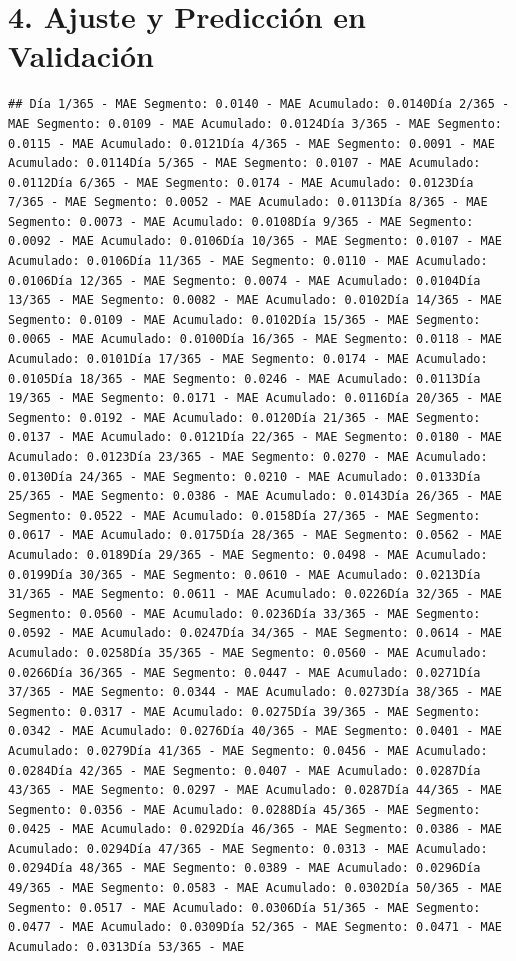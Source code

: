 \documentclass[
]{book}
\begin{document}
\section{4. Ajuste y Predicción en Validación}\label{ajuste-y-predicciuxf3n-en-validaciuxf3n}

\begin{verbatim}
## Día 1/365 - MAE Segmento: 0.0140 - MAE Acumulado: 0.0140Día 2/365 - MAE Segmento: 0.0109 - MAE Acumulado: 0.0124Día 3/365 - MAE Segmento: 0.0115 - MAE Acumulado: 0.0121Día 4/365 - MAE Segmento: 0.0091 - MAE Acumulado: 0.0114Día 5/365 - MAE Segmento: 0.0107 - MAE Acumulado: 0.0112Día 6/365 - MAE Segmento: 0.0174 - MAE Acumulado: 0.0123Día 7/365 - MAE Segmento: 0.0052 - MAE Acumulado: 0.0113Día 8/365 - MAE Segmento: 0.0073 - MAE Acumulado: 0.0108Día 9/365 - MAE Segmento: 0.0092 - MAE Acumulado: 0.0106Día 10/365 - MAE Segmento: 0.0107 - MAE Acumulado: 0.0106Día 11/365 - MAE Segmento: 0.0110 - MAE Acumulado: 0.0106Día 12/365 - MAE Segmento: 0.0074 - MAE Acumulado: 0.0104Día 13/365 - MAE Segmento: 0.0082 - MAE Acumulado: 0.0102Día 14/365 - MAE Segmento: 0.0109 - MAE Acumulado: 0.0102Día 15/365 - MAE Segmento: 0.0065 - MAE Acumulado: 0.0100Día 16/365 - MAE Segmento: 0.0118 - MAE Acumulado: 0.0101Día 17/365 - MAE Segmento: 0.0174 - MAE Acumulado: 0.0105Día 18/365 - MAE Segmento: 0.0246 - MAE Acumulado: 0.0113Día 19/365 - MAE Segmento: 0.0171 - MAE Acumulado: 0.0116Día 20/365 - MAE Segmento: 0.0192 - MAE Acumulado: 0.0120Día 21/365 - MAE Segmento: 0.0137 - MAE Acumulado: 0.0121Día 22/365 - MAE Segmento: 0.0180 - MAE Acumulado: 0.0123Día 23/365 - MAE Segmento: 0.0270 - MAE Acumulado: 0.0130Día 24/365 - MAE Segmento: 0.0210 - MAE Acumulado: 0.0133Día 25/365 - MAE Segmento: 0.0386 - MAE Acumulado: 0.0143Día 26/365 - MAE Segmento: 0.0522 - MAE Acumulado: 0.0158Día 27/365 - MAE Segmento: 0.0617 - MAE Acumulado: 0.0175Día 28/365 - MAE Segmento: 0.0562 - MAE Acumulado: 0.0189Día 29/365 - MAE Segmento: 0.0498 - MAE Acumulado: 0.0199Día 30/365 - MAE Segmento: 0.0610 - MAE Acumulado: 0.0213Día 31/365 - MAE Segmento: 0.0611 - MAE Acumulado: 0.0226Día 32/365 - MAE Segmento: 0.0560 - MAE Acumulado: 0.0236Día 33/365 - MAE Segmento: 0.0592 - MAE Acumulado: 0.0247Día 34/365 - MAE Segmento: 0.0614 - MAE Acumulado: 0.0258Día 35/365 - MAE Segmento: 0.0560 - MAE Acumulado: 0.0266Día 36/365 - MAE Segmento: 0.0447 - MAE Acumulado: 0.0271Día 37/365 - MAE Segmento: 0.0344 - MAE Acumulado: 0.0273Día 38/365 - MAE Segmento: 0.0317 - MAE Acumulado: 0.0275Día 39/365 - MAE Segmento: 0.0342 - MAE Acumulado: 0.0276Día 40/365 - MAE Segmento: 0.0401 - MAE Acumulado: 0.0279Día 41/365 - MAE Segmento: 0.0456 - MAE Acumulado: 0.0284Día 42/365 - MAE Segmento: 0.0407 - MAE Acumulado: 0.0287Día 43/365 - MAE Segmento: 0.0297 - MAE Acumulado: 0.0287Día 44/365 - MAE Segmento: 0.0356 - MAE Acumulado: 0.0288Día 45/365 - MAE Segmento: 0.0425 - MAE Acumulado: 0.0292Día 46/365 - MAE Segmento: 0.0386 - MAE Acumulado: 0.0294Día 47/365 - MAE Segmento: 0.0313 - MAE Acumulado: 0.0294Día 48/365 - MAE Segmento: 0.0389 - MAE Acumulado: 0.0296Día 49/365 - MAE Segmento: 0.0583 - MAE Acumulado: 0.0302Día 50/365 - MAE Segmento: 0.0517 - MAE Acumulado: 0.0306Día 51/365 - MAE Segmento: 0.0477 - MAE Acumulado: 0.0309Día 52/365 - MAE Segmento: 0.0471 - MAE Acumulado: 0.0313Día 53/365 - MAE 
\end{verbatim}
\end{document}

